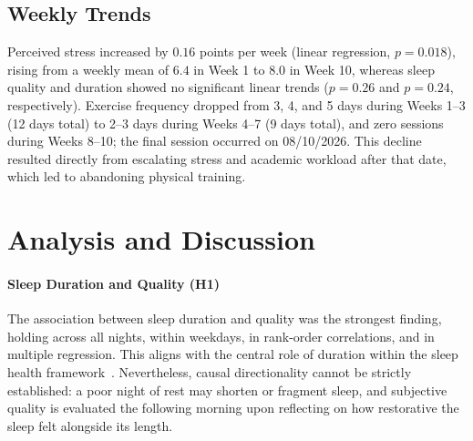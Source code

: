 \documentclass[conference]{IEEEtran}
\begin{document}
\begin{table}[h]
\centering
\caption{Multiple linear regression predicting sleep quality ($n=69$, $R^2=0.52$).}
\label{tab:ols}
\end{table}

\subsection{Weekly Trends}
Perceived stress increased by $0.16$ points per week (linear regression, $p=0.018$), rising from a weekly mean of $6.4$ in Week 1 to $8.0$ in Week 10, whereas sleep quality and duration showed no significant linear trends ($p=0.26$ and $p=0.24$, respectively). Exercise frequency dropped from 3, 4, and 5 days during Weeks 1--3 (12 days total) to 2--3 days during Weeks 4--7 (9 days total), and zero sessions during Weeks 8--10; the final session occurred on 08/10/2026. This decline resulted directly from escalating stress and academic workload after that date, which led to abandoning physical training.

\section{Analysis and Discussion}

\paragraph{Sleep Duration and Quality (H1)}
The association between sleep duration and quality was the strongest finding, holding across all nights, within weekdays, in rank-order correlations, and in multiple regression. This aligns with the central role of duration within the sleep health framework~\cite{ref1}. Nevertheless, causal directionality cannot be strictly established: a poor night of rest may shorten or fragment sleep, and subjective quality is evaluated the following morning upon reflecting on how restorative the sleep felt alongside its length.
\end{document}
